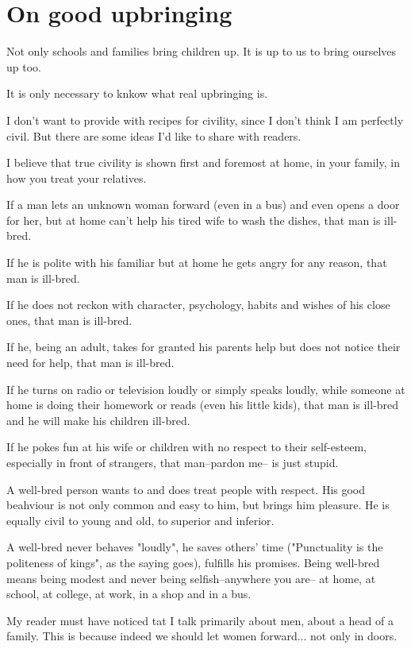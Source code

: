 \chapter{On good upbringing}

Not only schools and families bring children up. It is up to us to bring ourselves up too.

It is only necessary to knkow what real upbringing is.

I don't want to provide with recipes for civility, since I don't think I am perfectly civil. But there are some ideas I'd like to share with readers.

I believe that true civility is shown first and foremost at home, in your family, in how you treat your relatives.

If a man lets an unknown woman forward (even in a bus) and even opens a door for her, but at home can't help his tired wife to wash the dishes, that man is ill-bred.

If he is polite with his familiar but at home he gets angry for any reason, that man is ill-bred.

If he does not reckon with character, psychology, habits and wishes of his close ones, that man is ill-bred.

If he, being an adult, takes for granted his parents help but does not notice their need for help, that man is ill-bred.

If he turns on radio or television loudly or simply speaks loudly, while someone at home is doing their homework or reads (even his little kids), that man is ill-bred and he will make his children ill-bred.

If he pokes fun at his wife or children with no respect to their self-esteem, especially in front of strangers, that man--pardon me-- is just stupid.

A well-bred person wants to and does treat people with respect. His good beahviour is not only common and easy to him, but brings him pleasure. He is equally civil to young and old, to superior and inferior.

A well-bred never behaves "loudly", he saves others' time ("Punctuality is the politeness of kings", as the saying goes), fulfills his promises. Being well-bred means being modest and never being selfish--anywhere you are-- at home, at school, at college, at work, in a shop and in a bus.

My reader must have noticed tat I talk primarily about men, about a head of a family. This is because indeed we should let women forward... not only in doors.

